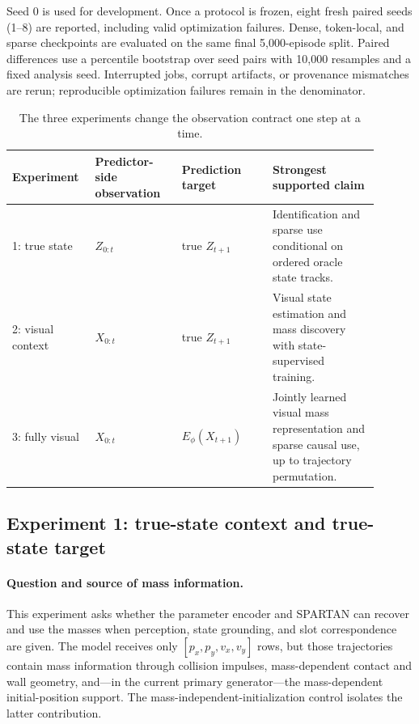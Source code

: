 Seed 0 is used for development.  Once a protocol is frozen, eight fresh paired seeds (1--8) are
reported, including valid optimization failures.  Dense, token-local, and sparse checkpoints are
evaluated on the same final 5,000-episode split.  Paired differences use a percentile bootstrap
over seed pairs with 10,000 resamples and a fixed analysis seed.  Interrupted jobs, corrupt
artifacts, or provenance mismatches are rerun; reproducible optimization failures remain in the
denominator.

\begin{table}[t]
    \centering
    \small
    \begin{tabular}{p{0.18\linewidth}p{0.22\linewidth}p{0.23\linewidth}p{0.27\linewidth}}
        \toprule
        Experiment & Predictor-side observation & Prediction target & Strongest supported claim \\
        \midrule
        1: true state & $Z_{0:t}$ & true $Z_{t+1}$ & Identification and sparse use conditional on ordered oracle state tracks. \\
        2: visual context & $X_{0:t}$ & true $Z_{t+1}$ & Visual state estimation and mass discovery with state-supervised training. \\
        3: fully visual & $X_{0:t}$ & $E_\phi(X_{t+1})$ & Jointly learned visual mass representation and sparse causal use, up to trajectory permutation. \\
        \bottomrule
    \end{tabular}
    \caption{The three experiments change the observation contract one step at a time.}
    \label{tab:experiment-ladder}
\end{table}

\subsection{Experiment 1: true-state context and true-state target}
\label{sec:experiments:true-state}

\paragraph{Question and source of mass information.}
This experiment asks whether the parameter encoder and SPARTAN can recover and use the masses
when perception, state grounding, and slot correspondence are given.  The model receives only
$[p_x,p_y,v_x,v_y]$ rows, but those trajectories contain mass information through collision
impulses, mass-dependent contact and wall geometry, and---in the current primary generator---the
mass-dependent initial-position support.  The mass-independent-initialization control isolates
the latter contribution.

